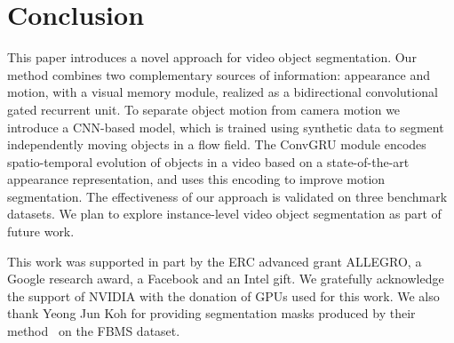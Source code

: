 \section{Conclusion}
This paper introduces a novel approach for video object segmentation. Our
method combines two complementary sources of information: appearance and
motion, with a visual memory module, realized as a bidirectional convolutional
gated recurrent unit. To separate object motion from camera motion we introduce
a CNN-based model, which is trained using synthetic data to segment
independently moving objects in a flow field. The ConvGRU module encodes
spatio-temporal evolution of objects in a video based on a state-of-the-art
appearance representation, and uses this encoding to improve motion
segmentation. The effectiveness of our approach is validated on three benchmark
datasets. We plan to explore instance-level video object segmentation as part
of future work.

\begin{acknowledgements}
This work was supported in part by the ERC advanced grant ALLEGRO, a Google
research award, a Facebook and an Intel gift. We gratefully acknowledge the
support of NVIDIA with the donation of GPUs used for this work. We also thank
Yeong Jun Koh for providing segmentation masks produced by their
method~\cite{kohprimary} on the FBMS dataset.
\end{acknowledgements}

     



